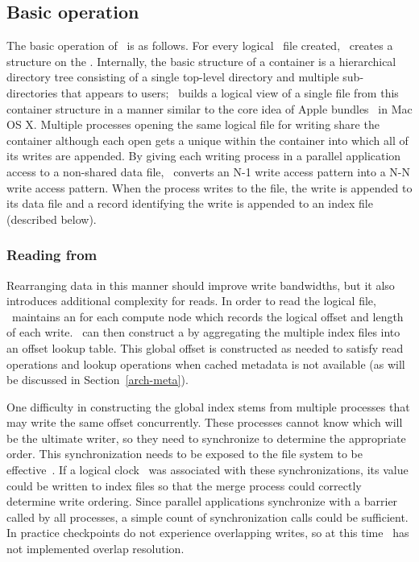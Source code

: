 \subsection{Basic operation}
The basic operation of \plfs\ is as follows. For every logical \plfs\ file
created, \plfs\ creates a  structure on the \upfs. Internally,
the basic structure of a container is a hierarchical directory tree consisting
of a single top-level directory and multiple sub-directories that appears to
users; \plfs\ builds a logical view of a single file from this container
structure in a manner similar to the core idea of Apple
bundles~\cite{bundles} in Mac OS X.  Multiple processes opening the same
logical file for writing share the container although each open gets a unique
 within the container into which all of its writes are
appended. By giving each writing process in a parallel application access to a
non-shared data file, \plfs\ converts an N-1 write access pattern into a N-N
write access pattern.  When the process writes to the file, the write is
appended to its data file and a record identifying the write is appended to an
index file (described below). 


\subsubsection{Reading from \plfs}
\label{arch-read}
Rearranging data in this manner should improve write bandwidths, but
it also introduces additional complexity for reads. In order to read 
the logical file, \plfs\ maintains an  for each compute
node which records the logical offset and length of each write. \plfs\ can
then construct a  by aggregating the multiple index files 
into an offset lookup table.  This global offset is constructed as needed to
satisfy read operations and lookup operations when cached metadata is not
available (as will be discussed in Section~\ref{arch-meta}).

One difficulty in constructing the global index stems from multiple
processes that may write the same offset concurrently.  These processes
cannot know which will be the ultimate writer, so they need to synchronize to
determine the appropriate order. This synchronization needs to be exposed to
the file system to be effective~\cite{Gibson95thescotch}. If a logical
clock~\cite{lamport1978} was associated with these synchronizations, its value
could be written to index files so that the merge process could correctly
determine write ordering. Since parallel applications synchronize with a
barrier called by all processes, a simple count of synchronization calls could
be sufficient. In practice checkpoints do not experience overlapping writes, so
at this time \plfs\ has not implemented overlap resolution.

